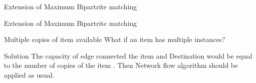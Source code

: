 \documentclass{beamer}
\begin{document}
\begin{frame}{Extension of Maximum Bipartrite matching}
\begin{tikzpicture}
            
            

        \end{tikzpicture}
    
    
\end{frame}
\begin{frame}{Extension of Maximum Bipartrite matching}
    \begin{block}{Multiple copies of item available }
    What if an item has multiple instances?
\end{block}
    \begin{block}{Solution}
        The capacity of edge connected the  item and Destination would be equal to the number of copies of the item . Then Network flow algorithm should be applied as usual.
    \end{block}
\end{frame}
\end{document}
